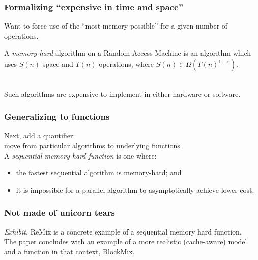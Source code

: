 \begin{frame}
  \frametitle{Formalizing ``expensive in time and space''}
  
    Want to force use of the ``most memory possible'' for a given
    number of operations.\\[1em]
  
    \begin{defn}
      A \emph{memory-hard} algorithm on a Random Access Machine is an
      algorithm which uses $S(n)$ space and $T(n)$ operations, where
      $S(n) \in \Omega(T(n)^{1-\varepsilon})$.
    \end{defn}~\\
    
      Such algorithms are expensive to implement in either hardware or software.
    

\end{frame}

\begin{frame}
  \frametitle{Generalizing to functions}
  
    Next, add a quantifier: \\move from particular algorithms to underlying functions.\\[1em]
    A \emph{sequential memory-hard function} is one where:

    \begin{itemize}
      \item the fastest
        sequential algorithm is memory-hard; and
      \item it is impossible for a
        parallel algorithm to asymptotically achieve lower cost.
    \end{itemize}
  
\end{frame}

\begin{frame}
  \frametitle{Not made of unicorn tears}
  
    \emph{Exhibit.} ReMix is a concrete example of a sequential memory hard function.\\[1em]
    The paper concludes with an example of a more realistic (cache-aware) model and
    a function in that context, BlockMix.
  
\end{frame}

